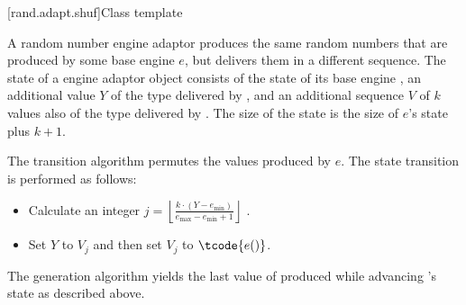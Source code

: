 [rand.adapt.shuf]{Class template }%
%

\pnum
A  random number engine adaptor
produces the same random numbers
that are produced by some base engine $e$,
but delivers them in a different sequence.
The state%
%
of a  engine adaptor object 
consists of
 the state  of its base engine ,
 an additional value $Y$ of the type delivered by ,
and
 an additional sequence $V$ of $k$ values
 also of the type delivered by .
The size of the state is
 the size of $e$'s state plus $k + 1$.

\pnum
The transition algorithm%
%
permutes the values produced by $e$.
The state transition is performed as follows:
\begin{itemize}
 \item
   Calculate an integer
   $j = \left\lfloor \frac{k \cdot (Y - e_{\min})}
                          {e_{\max} - e_{\min} +1}
        \right\rfloor
   $%
   .
 \item
   Set $Y$ to $V_j$ and then set $V_j$ to $\tcode{e()}$.
\end{itemize}

\pnum
The generation algorithm%
%
yields the last value of 
 produced while advancing 's state as described above.

